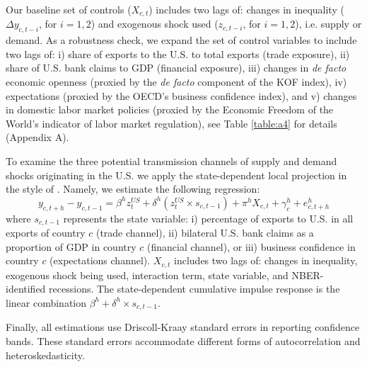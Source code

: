 \documentclass[12pt, a4paper]{article}
\begin{document}
Our baseline set of controls ($X_{c,t}$) includes two lags of: changes in inequality ($\Delta y_{c,t-i}$, for $i =1,2$) and exogenous shock used ($z_{c,t-i}$, for $i =1,2$), i.e. supply or demand. As a robustness check, we expand the set of control variables to include two lags of: i) share of exports to the U.S. to total exports (trade exposure), ii) share of U.S. bank claims to GDP (financial exposure), iii) changes in \textit{de facto} economic openness (proxied by the \textit{de facto} component of the KOF index), iv) expectations (proxied by the OECD's business confidence index), and v) changes in domestic labor market policies (proxied by the Economic Freedom of the World's indicator of labor market regulation), see Table \ref{table:a4} for details (Appendix A).

To examine the three potential transmission channels of supply and demand shocks originating in the U.S. we apply the state-dependent local projection in the style of \textcite{auerbach2013output}. Namely, we estimate the following regression:
\begin{equation}
    y_{c,t+h}-y_{c,t-1} = \beta^h z^{US}_{t} + \delta^h (z^{US}_{t} \times s_{c,t-1}) + \pi^h X_{c,t} + \gamma^h_c + e^h_{c, t+h}
\label{eq:2}
\end{equation}
where $s_{c,t-1}$ represents the state variable: i) percentage of exports to U.S. in all exports of country $c$ (trade channel), ii) bilateral U.S. bank claims as a proportion of GDP in country $c$ (financial channel), or iii) business confidence in country $c$ (expectations channel). $X_{c,t}$ includes two lags of: changes in inequality, exogenous shock being used, interaction term, state variable, and NBER-identified recessions. The state-dependent cumulative impulse response is the linear combination $\beta^h + \delta^h \times s_{c,t-1}$.

Finally, all estimations use Driscoll-Kraay standard errors in reporting confidence bands. These standard errors accommodate different forms of autocorrelation and heteroskedasticity.

\end{document}
